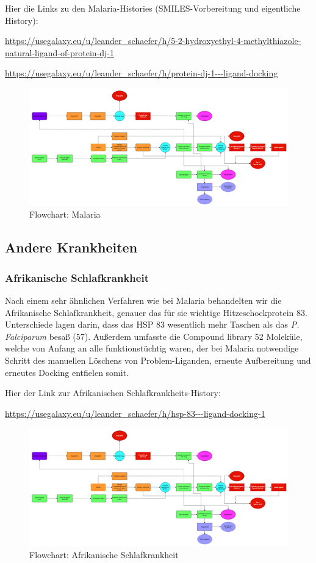 \documentclass[10pt]{article}
\begin{document}
    Hier die Links zu den Malaria-Histories (SMILES-Vorbereitung und eigentliche History):

    \url{https://usegalaxy.eu/u/leander_schaefer/h/5-2-hydroxyethyl-4-methylthiazole-natural-ligand-of-protein-dj-1}

    \url{https://usegalaxy.eu/u/leander_schaefer/h/protein-dj-1---ligand-docking}


    \begin{figure}[h]
        \centering
        \includegraphics[width=0.7\linewidth]{malaria-flowchart}
        \caption{Flowchart: Malaria}
    \end{figure}

    \subsection{Andere Krankheiten}\label{subsubsec:andere-krankheiten}

    \subsubsection{Afrikanische Schlafkrankheit}
    Nach einem sehr ähnlichen Verfahren wie bei Malaria behandelten wir die Afrikanische Schlafkrankheit, genauer das
    für sie wichtige Hitzeschockprotein 83. Unterschiede lagen darin, dass das HSP 83 wesentlich mehr Taschen als
    das \emph{P. Falciparum} besaß (57). Außerdem umfasste die Compound library 52 Moleküle, welche von Anfang an alle
    funktionstüchtig waren, der bei Malaria notwendige Schritt des manuellen Löschens von Problem-Liganden, erneute
    Aufbereitung und erneutes Docking entfielen somit.

    Hier der Link zur Afrikanischen Schlafkrankheits-History:

    \url{https://usegalaxy.eu/u/leander_schaefer/h/hsp-83---ligand-docking-1}


    \begin{figure}[h]
        \centering
        \includegraphics[width=0.7\linewidth]{afrikanische schlafkrankheit-flowchart}
        \caption{Flowchart: Afrikanische Schlafkrankheit}
    \end{figure}
\end{document}
